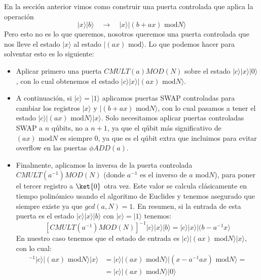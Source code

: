 \documentclass[a4paper,11pt]{book} %
\numberwithin{equation}{chapter}
\begin{document}
En la sección anterior vimos como construir una puerta controlada que aplica la operación
	\begin{equation}
	| x \rangle | b \rangle \quad \rightarrow \quad |x \rangle | (b+ax) \text{ mod}N \rangle
	\end{equation}
Pero esto no es lo que queremos, nosotros queremos una puerta controlada que nos lleve el estado $|x \rangle$ al estado $| (ax) \text{ mod} \rangle$. Lo que podemos hacer para solventar esto es lo siguiente:

\begin{itemize}
	\item Aplicar primero una puerta $CMULT(a)MOD(N)$ sobre el estado $|c\rangle |x \rangle |0 \rangle$, con lo cual obtenemos el estado $|c \rangle |x \rangle | (ax) \text{ mod} N \rangle$. 
 
	\item A continuación, si $|c \rangle = | 1 \rangle$ aplicamos puertas SWAP controladas  para cambiar los registros $|x \rangle$ y $|(b + ax) \text{ mod} N \rangle$, con lo cual pasamos a tener el estado $|c \rangle |(ax) \text{ mod} N \rangle |x \rangle $. Solo necesitamos aplicar puertas controladas SWAP a $n$ qúbits, no a $n+1$, ya que el qúbit más significativo de $(ax) \text{ mod}N$ es siempre 0, ya que es el qúbit extra que incluimos para evitar overflow en las puertas $\phi ADD (a)$. 
 
	\item Finalmente, aplicamos la inversa de la puerta controlada $CMULT(a^{-1}) MOD(N)$ (donde $a^{-1}$ es el inverso de $a$ mod$N$), para poner el tercer registro a $\ket{0}$ otra vez. Este valor se calcula clásicamente en tiempo polinómico usando el algoritmo de Euclides y tenemos asegurado que siempre existe ya que $gcd(a,N) =1$. En resumen, si la entrada de esta puerta es el estado $|c \rangle | x \rangle | b \rangle$ con $|c \rangle = |1 \rangle$ tenemos:
	\begin{equation}
	 \boxed{[CMULT(a^{-1}) MOD(N)]^{-1} |c \rangle | x \rangle | b \rangle = |c \rangle | x \rangle | (b - a^{-1}x \rangle}
	\end{equation}
 En nuestro caso tenemos que el estado de entrada es $|c \rangle |(ax) \text{ mod} N \rangle |x \rangle $, con lo cual:
 \begin{align*}
  [CMULT(a^{-1}) MOD(N)]^{-1} |c \rangle |(ax) \text{ mod} N \rangle |x \rangle & = |c \rangle |(ax) \text{ mod} N \rangle |(x - a^{-1} ax )\text{ mod} N \rangle = \\
  & = |c \rangle |(ax) \text{ mod} N \rangle | 0 \rangle
 \end{align*}
 
\end{itemize}
\end{document}
